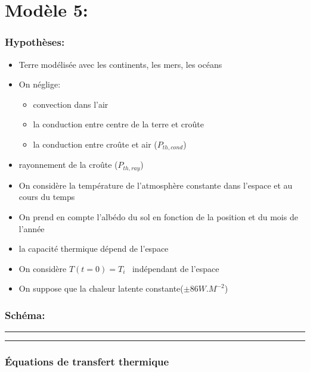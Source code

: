\documentclass[a4paper,12pt]{article}
\begin{document}
\section*{Modèle 5: }
\subsubsection*{Hypothèses:}
\begin{itemize}
    \item Terre modélisée avec les continents, les mers, les océans 
    \item  On néglige: 
    \begin{itemize}
        \item convection dans l'air
        \item la conduction entre centre de la terre et croûte
        \item la conduction entre croûte et air (\(P_{th,cond}\))
    \end{itemize} 
    \item  rayonnement de la croûte (\(P_{th,ray}\))
    \item On considère la température de l'atmosphère constante dans l'espace et  au cours du temps 
    \item On prend en compte l'albédo du sol en fonction de la position et du mois de l'année 
    \item la capacité thermique dépend de l'espace 
    \item On considère $T(t=0) = T_i$ \  indépendant de l'espace  
    \item On suppose que la chaleur latente constante($\pm 86 W.M^{-2}$)
    
    
    
    
\end{itemize}

\subsubsection*{Schéma:} 
\noindent\textcolor{gray}{\rule{\linewidth}{0.4pt}}

    
\begin{center}
  
\end{center}
\noindent\textcolor{gray}{\rule{\linewidth}{0.4pt}}

\subsubsection*{Équations de transfert thermique}
\end{document}
